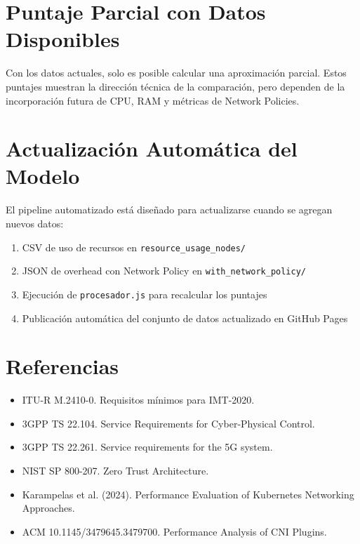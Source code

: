 \documentclass[12pt,a4paper]{article}
\begin{document}
\section{Puntaje Parcial con Datos Disponibles}

Con los datos actuales, solo es posible calcular una aproximación parcial. Estos puntajes muestran la dirección técnica de la comparación, pero dependen de la incorporación futura de CPU, RAM y métricas de Network Policies.

\section{Actualización Automática del Modelo}

El pipeline automatizado está diseñado para actualizarse cuando se agregan nuevos datos:

\begin{enumerate}
  \item CSV de uso de recursos en \texttt{resource_usage_nodes/}
  \item JSON de overhead con Network Policy en \texttt{with_network_policy/}
  \item Ejecución de \texttt{procesador.js} para recalcular los puntajes
  \item Publicación automática del conjunto de datos actualizado en GitHub Pages
\end{enumerate}

\section{Referencias}

\begin{itemize}
  \item ITU-R M.2410-0. Requisitos mínimos para IMT-2020.
  \item 3GPP TS 22.104. Service Requirements for Cyber-Physical Control.
  \item 3GPP TS 22.261. Service requirements for the 5G system.
  \item NIST SP 800-207. Zero Trust Architecture.
  \item Karampelas et al. (2024). Performance Evaluation of Kubernetes Networking Approaches.
  \item ACM 10.1145/3479645.3479700. Performance Analysis of CNI Plugins.
\end{itemize}
\end{document}
